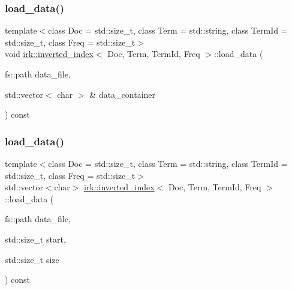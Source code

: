 \mbox{\label{classirk_1_1inverted__index_a231961e5ef231dabb4cd02becb64db5a}} 
\subsubsection{\texorpdfstring{load\+\_\+data()}{load\_data()}\hspace{0.1cm}{\footnotesize\ttfamily [1/2]}}
{\footnotesize\ttfamily template$<$class Doc  = std\+::size\+\_\+t, class Term  = std\+::string, class Term\+Id  = std\+::size\+\_\+t, class Freq  = std\+::size\+\_\+t$>$ \\
void \mbox{\hyperlink{classirk_1_1inverted__index}{irk\+::inverted\+\_\+index}}$<$ Doc, Term, Term\+Id, Freq $>$\+::load\+\_\+data (\begin{DoxyParamCaption}\item[{fs\+::path}]{data\+\_\+file,  }\item[{std\+::vector$<$ char $>$ \&}]{data\+\_\+container }\end{DoxyParamCaption}) const\hspace{0.3cm}{\ttfamily [inline]}}

\mbox{\label{classirk_1_1inverted__index_a66e54902ec83c229af58f1f6b443ed0d}} 
\subsubsection{\texorpdfstring{load\+\_\+data()}{load\_data()}\hspace{0.1cm}{\footnotesize\ttfamily [2/2]}}
{\footnotesize\ttfamily template$<$class Doc  = std\+::size\+\_\+t, class Term  = std\+::string, class Term\+Id  = std\+::size\+\_\+t, class Freq  = std\+::size\+\_\+t$>$ \\
std\+::vector$<$char$>$ \mbox{\hyperlink{classirk_1_1inverted__index}{irk\+::inverted\+\_\+index}}$<$ Doc, Term, Term\+Id, Freq $>$\+::load\+\_\+data (\begin{DoxyParamCaption}\item[{fs\+::path}]{data\+\_\+file,  }\item[{std\+::size\+\_\+t}]{start,  }\item[{std\+::size\+\_\+t}]{size }\end{DoxyParamCaption}) const\hspace{0.3cm}{\ttfamily [inline]}}

